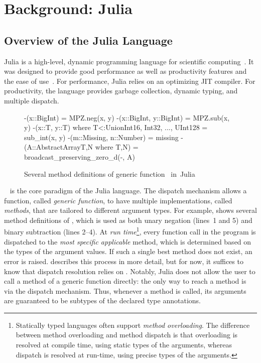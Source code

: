 \chapter{Background: Julia}

\section{Overview of the Julia Language}

Julia is a high-level, dynamic programming language for scientific computing~\cite{TODO}.
It was designed to provide good performance as well as productivity features and
the ease of use~\cite{TODO}.
For performance, Julia relies on an optimizing JIT compiler.
For productivity, the language provides garbage collection, dynamic typing, and
multiple dispatch. 

\begin{figure}[t]
\begin{julia}
-(x::BigInt) = MPZ.neg(x, y)
-(x::BigInt, y::BigInt) = MPZ.sub(x, y)
-(x::T, y::T) where T<:Union{Int16, Int32, ..., UInt128} = sub_int(x, y)
-(m::Missing, n::Number) = missing
-(A::AbstractArray{T,N} where {T,N}) = broadcast_preserving_zero_d(-, A)
\end{julia}
\caption{Several method definitions of generic function~\cjl{(-)}
in~Julia}\label{fig:code:subtraction}
\end{figure}

~\cite{TODO} is the core paradigm of the Julia
language. The dispatch mechanism allows a function, called \emph{generic
function}, to have multiple implementations, called \emph{methods}, that are
tailored to different argument types. For example, 
shows several method definitions of \cjl{(-)}, which is used as both unary
negation (lines~1 and 5) and binary subtraction (lines 2--4).
At \emph{run time}\footnote{Statically typed languages often support
\emph{method overloading}. The difference between method overloading and method
dispatch is that overloading is resolved at compile time, using static types of
the arguments, whereas dispatch is resolved at run-time, using precise types
of the arguments.},
every function call in the program is dispatched to the
\emph{most specific applicable} method, which is determined based on the
types of the argument values. If such a single best method does not exist,
an error is raised.
 describes this process in more detail, but for now,
it suffices to know that dispatch resolution relies on .
Notably, Julia does not allow the user to call a method of a generic function
directly: the only way to reach a method is via the dispatch mechanism.
Thus, whenever a method is called, its arguments are guaranteed to be
subtypes of the declared type annotations.

